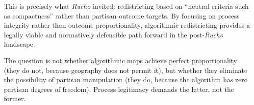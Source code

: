 This is precisely what \textit{Rucho} invited: redistricting based on ``neutral criteria such as compactness'' rather than partisan outcome targets. By focusing on process integrity rather than outcome proportionality, algorithmic redistricting provides a legally viable and normatively defensible path forward in the post-\textit{Rucho} landscape.

The question is not whether algorithmic maps achieve perfect proportionality (they do not, because geography does not permit it), but whether they eliminate the possibility of partisan manipulation (they do, because the algorithm has zero partisan degrees of freedom). Process legitimacy demands the latter, not the former.
